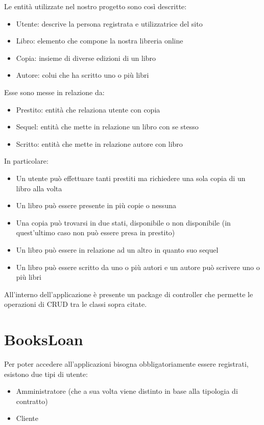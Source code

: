 \documentclass[a4paper,10pt]{article}
\begin{document}
Le entità utilizzate nel nostro progetto sono così descritte:

\begin{itemize}
	\item Utente: descrive la persona registrata e utilizzatrice del sito
	\item Libro: elemento che compone la nostra libreria online
	\item Copia: insieme di diverse edizioni di un libro
	\item Autore: colui che ha scritto uno o più libri
\end{itemize}

Esse sono messe in relazione da:
\begin{itemize}
	\item Prestito: entità che relaziona utente con copia
	\item Sequel: entità che mette in relazione un libro con se stesso
	\item Scritto: entità che mette in relazione autore con libro
\end{itemize}

In particolare:
\begin{itemize}
	\item Un utente può effettuare tanti prestiti ma richiedere una sola copia di un libro alla volta
	\item Un libro può essere presente in più copie o nessuna
	\item Una copia può trovarsi in due stati, disponibile o non disponibile (in quest'ultimo caso non può essere presa in prestito)
	\item Un libro può essere in relazione ad un altro in quanto suo sequel
	\item Un libro può essere scritto da uno o più autori e un autore può scrivere uno o più libri
\end{itemize}

All’interno dell’applicazione è presente un package di controller che permette le operazioni di CRUD tra le classi sopra citate.

\section*{BooksLoan}
Per poter accedere all’applicazioni bisogna obbligatoriamente essere registrati, esistono due tipi di utente:

\begin{itemize}
	\item Amministratore (che a sua volta viene distinto in base alla tipologia di contratto)
	\item Cliente
\end{itemize}
\end{document}
